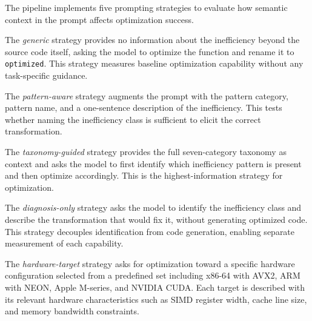 The pipeline implements five prompting strategies to evaluate how semantic context in the prompt affects optimization success.

The \textit{generic} strategy provides no information about the inefficiency beyond the source code itself, asking the model to optimize the function and rename it to \texttt{optimized}. This strategy measures baseline optimization capability without any task-specific guidance.

The \textit{pattern-aware} strategy augments the prompt with the pattern category, pattern name, and a one-sentence description of the inefficiency. This tests whether naming the inefficiency class is sufficient to elicit the correct transformation.

The \textit{taxonomy-guided} strategy provides the full seven-category taxonomy as context and asks the model to first identify which inefficiency pattern is present and then optimize accordingly. This is the highest-information strategy for optimization.

The \textit{diagnosis-only} strategy asks the model to identify the inefficiency class and describe the transformation that would fix it, without generating optimized code. This strategy decouples identification from code generation, enabling separate measurement of each capability.

The \textit{hardware-target} strategy asks for optimization toward a specific hardware configuration selected from a predefined set including x86-64 with AVX2, ARM with NEON, Apple M-series, and NVIDIA CUDA. Each target is described with its relevant hardware characteristics such as SIMD register width, cache line size, and memory bandwidth constraints.
